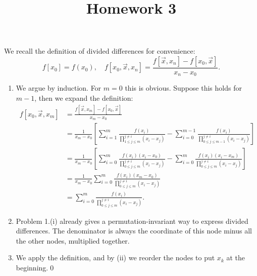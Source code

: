 \documentclass{homework}
\title{Homework 3}
\begin{document}
\maketitle

\begin{problem}
We recall the definition of divided differences for convenience:
\[f[x_0] = f(x_0), \quad f[x_0,\vec x,x_n] = \frac{f[\vec x,x_n] - f[x_0,\vec x]}{x_n - x_0}.\]
\begin{enumerate}[label=(\roman*)]
\item We argue by induction. For \(m=0\) this is obvious. Suppose this holds for \(m-1\), then we expand the definition:
\[\begin{aligned}
f[x_0,\vec x,x_m]
&= \frac{f[\vec x,x_m] - f[x_0,\vec x]}{x_m - x_0}\\
&= \frac{1}{x_m-x_0} \left[\sum_{i=1}^{m} \frac{f(x_i)}{\prod_{1\le j \le m}^{j\ne i}(x_i-x_j)} - \sum_{i=0}^{m-1} \frac{f(x_i)}{\prod_{0\le j \le m-1}^{j\ne i}(x_i-x_j)}\right]\\
&= \frac{1}{x_m-x_0} \left[\sum_{i=0}^{m} \frac{f(x_i)(x_i-x_0)}{\prod_{0\le j \le m}^{j\ne i}(x_i-x_j)} - \sum_{i=0}^{m} \frac{f(x_i) (x_i-x_m)}{\prod_{0\le j \le m}^{j\ne i}(x_i-x_j)}\right]\\
&= \frac{1}{x_m-x_0} \sum_{i=0}^m \frac{f(x_i) (x_m - x_0)}{\prod_{0\le j\le m}^{j\ne i} (x_i-x_j)}\\
&= \sum_{i=0}^m \frac{f(x_i)}{\prod_{0\le j\le m}^{j\ne i} (x_i-x_j)}.
\end{aligned}\]
\item Problem 1.(i) already gives a permutation-invariant way to express divided differences. The denominator is always the coordinate of this node minus all the other nodes, multiplied together.
\item We apply the definition, and by (ii) we reorder the nodes to put \(x_k\) at the beginning.\qed
\end{enumerate}
\renewcommand{\qed}{}
\end{problem}
\end{document}
